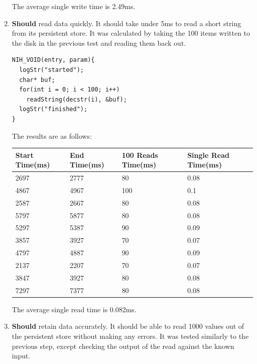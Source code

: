 \documentclass{article}
\begin{document}
\begin{enumerate}
The average single write time is 2.49ms.

\item \textbf{Should} read data quickly. It should take under 5ms to read a short string from its persistent store. It was calculated by taking the 100 items written to the disk in the previous test and reading them back out.

\begin{tcolorbox}[colback=white,grow to left by=2.5mm,grow to right by=2.5mm,left*=0mm,right*=0mm,sharp corners]
\begin{verbatim}
NIH_VOID(entry, param){
  logStr("started");
  char* buf;
  for(int i = 0; i < 100; i++)
    readString(decstr(i), &buf);
  logStr("finished");
}
\end{verbatim}
\end{tcolorbox}

The results are as follows:
\begin{table}[H]
\begin{tabular}{|l|l|l|l|}
\hline
Start Time(ms)		&End Time(ms)				&100 Reads Time(ms)		&Single Read Time(ms)		\\ \hline
2697	 & 2777	 & 80	 & 0.08\\ \hline
4867	 & 4967	 & 100	 & 0.1\\ \hline
2587	 & 2667	 & 80	 & 0.08\\ \hline
5797	 & 5877	 & 80	 & 0.08\\ \hline
5297	 & 5387	 & 90	 & 0.09\\ \hline
3857	 & 3927	 & 70	 & 0.07\\ \hline
4797	 & 4887	 & 90	 & 0.09\\ \hline
2137	 & 2207	 & 70	 & 0.07\\ \hline
3847	 & 3927	 & 80	 & 0.08\\ \hline
7297	 & 7377	 & 80	 & 0.08\\ \hline
\end{tabular}
\end{table}

The average single read time is 0.082ms.

\item \textbf{Should} retain data accurately. It should be able to read 1000 values out of the persistent store without making any errors. It was tested similarly to the previous step, except checking the output of the read against the known input.


\end{enumerate}
\end{document}
